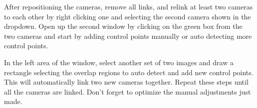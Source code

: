 \begin{fullwidth}

After repositioning the cameras, remove all links, and relink at least two cameras to each other by right clicking one and selecting the second camera shown in the dropdown. Open up the second window by clicking on the green box from the two cameras and start by adding control points manually or auto detecting more control points. 


In the left area of the window, select another set of two images and draw a rectangle selecting the overlap regions to auto detect and add new control points. This will automatically link two new cameras together. Repeat these steps until all the cameras are linked. Don’t forget to optimize the manual adjustments just made.



\clearpage
\end{fullwidth}